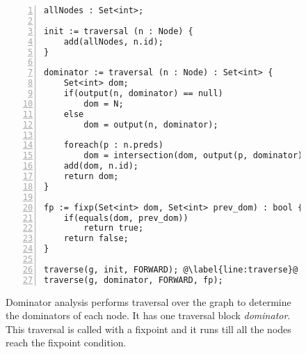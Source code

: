 \begin{figure}[ht!]
\centering
\begin{lstlisting}[numbers=left, tabsize=4, escapechar=@]
allNodes : Set<int>;

init := traversal (n : Node) { 
	add(allNodes, n.id);
}

dominator := traversal (n : Node) : Set<int> { 
	Set<int> dom;
	if(output(n, dominator) == null)
		dom = N;
	else
		dom = output(n, dominator);

	foreach(p : n.preds) 
		dom = intersection(dom, output(p, dominator)) 
	add(dom, n.id); 
	return dom; 
} 

fp := fixp(Set<int> dom, Set<int> prev_dom) : bool {
	if(equals(dom, prev_dom))
		return true;
	return false;
}

traverse(g, init, FORWARD); @\label{line:traverse}@
traverse(g, dominator, FORWARD, fp); 				
\end{lstlisting}
\caption{Dominator analysis performs traversal over the graph to determine the dominators of each node. It has one traversal block \textit{dominator}. This traversal is called with a fixpoint and it runs till all the nodes reach the fixpoint condition.}
\label{fig:dominator}
\end{figure}


